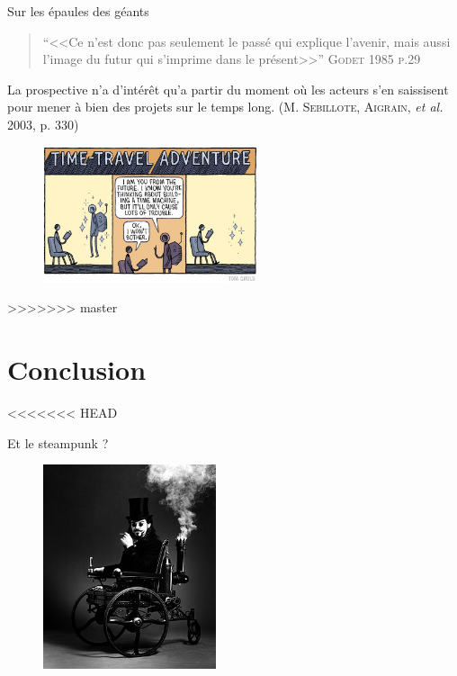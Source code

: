 \documentclass[newPxFont]{beamer}
\begin{document}
\begin{frame}[c]{Sur les épaules des géants}
\vspace{-2em}
\begin{quote}
  \enquote{<<Ce n'est donc pas seulement le passé qui explique l'avenir, mais aussi l'image du futur qui s'imprime dans le présent>>}
  \hspace*{\fill}\textsc{Godet 1985 p.29}
\end{quote}
La prospective n'a d'intérêt qu'a partir du moment où les acteurs s'en saissisent pour mener à bien des projets sur le temps long. (\textsc{M. Sebillote, Aigrain}, \textit{et al.} 2003, p. 330)
\begin{figure}
 \includegraphics[height=4cm]{img/a_thom_gauld_futureMachine.jpg}
\end{figure}
\end{frame}
>>>>>>> master

%
%
\section{Conclusion}

<<<<<<< HEAD
\begin{frame}[c]{Et le steampunk ?}
  \vspace{-2em}

  \begin{figure}
   \includegraphics[height=6cm]{img/a_www.jpg}
  \end{figure}
\end{frame}
\end{document}
